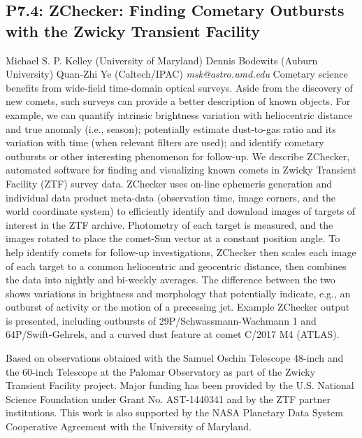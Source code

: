 \documentclass{report}
\begin{document}
\subsection*{P7.4: ZChecker: Finding Cometary Outbursts with the Zwicky Transient Facility}
\bigskip
Michael S. P. Kelley (University of Maryland) \newline Dennis Bodewits (Auburn University) \newline  Quan-Zhi Ye (Caltech/IPAC)\newline   \newline  \newline  \newline\newline
{\it msk@astro.umd.edu}\newline
\newline\newline
Cometary science benefits from wide-field time-domain optical surveys.  Aside from the discovery of new comets, such surveys can provide a better description of known objects.  For example, we can quantify intrinsic brightness variation with heliocentric distance and true anomaly (i.e., season); potentially estimate dust-to-gas ratio and its variation with time (when relevant filters are used); and identify cometary outbursts or other interesting phenomenon for follow-up.  We describe ZChecker, automated software for finding and visualizing known comets in Zwicky Transient Facility (ZTF) survey data.  ZChecker uses on-line ephemeris generation and individual data product meta-data (observation time, image corners, and the world coordinate system) to efficiently identify and download images of targets of interest in the ZTF archive.  Photometry of each target is measured, and the images rotated to place the comet-Sun vector at a constant position angle.  To help identify comets for follow-up investigations, ZChecker then scales each image of each target to a common heliocentric and geocentric distance, then combines the data into nightly and bi-weekly averages.  The difference between the two shows variations in brightness and morphology that potentially indicate, e.g., an outburst of activity or the motion of a precessing jet.  Example ZChecker output is presented, including outbursts of 29P/Schwassmann-Wachmann 1 and 64P/Swift-Gehrels, and a curved dust feature at comet C/2017 M4 (ATLAS).

Based on observations obtained with the Samuel Oschin Telescope 48-inch and the 60-inch Telescope at the Palomar Observatory as part of the Zwicky Transient Facility project.  Major funding has been provided by the U.S. National Science Foundation under Grant No. AST-1440341 and by the ZTF partner institutions.  This work is also supported by the NASA Planetary Data System Cooperative Agreement with the University of Maryland.\newline
\newpage
\end{document}
